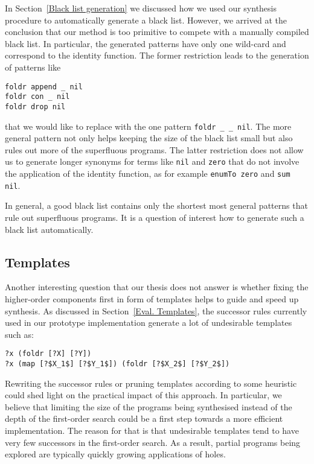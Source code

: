In Section~\ref{Black list generation} we discussed how we used our synthesis procedure to automatically generate a black list. However, we arrived at the conclusion that our method is too primitive to compete with a manually compiled black list. In particular, the generated patterns have only one wild-card and correspond to the identity function. The former restriction leads to the generation of patterns like
\begin{lstlisting}[style=plain]
foldr append _ nil
foldr con _ nil
foldr drop nil
\end{lstlisting}
that we would like to replace with the one pattern \lstinline!foldr _ _ nil!. The more general pattern not only helps keeping the size of the black list small but also rules out more of the superfluous programs.
The latter restriction does not allow us to generate longer synonyms for terms like \lstinline!nil! and \lstinline!zero! that do not involve the application of the identity function, as for example \lstinline!enumTo zero! and \lstinline!sum nil!.

In general, a good black list contains only the shortest most general patterns that rule out superfluous programs.  It is a question of interest how to generate such a black list automatically.

\subsection{Templates}
Another interesting question that our thesis does not answer is whether fixing the higher-order components first in form of templates helps to guide and speed up synthesis. As discussed in Section~\ref{Eval. Templates}, the successor rules currently used in our prototype implementation generate a lot of undesirable templates such as:
\begin{lstlisting}[style=plain]
?x (foldr [?X] [?Y])
?x (map [?$X_1$] [?$Y_1$]) (foldr [?$X_2$] [?$Y_2$])
\end{lstlisting}
Rewriting the successor rules or pruning templates according to some heuristic could shed light on the practical impact of this approach. In particular, we believe that limiting the size of the programs being synthesised instead of the depth of the first-order search could be a first step towards a more efficient implementation. The reason for that is that undesirable templates tend to have very few successors in the first-order search. As a result, partial programs being explored are typically quickly growing applications of holes.

